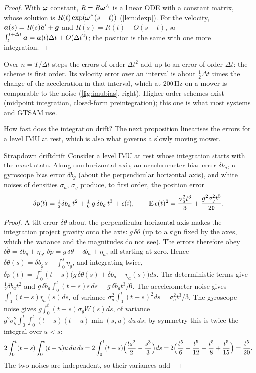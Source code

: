 \begin{proof}
With $\bm{\omega}$ constant, $\dot R=R\bm{\omega}^{\wedge}$ is a linear ODE with a
constant matrix, whose solution is $R(t)\exp(\bm{\omega}^{\wedge}(s-t))$
(\cref{lem:dexp}). For the velocity, $\bm{a}(s)=R(s)\tilde{\bm{a}}'
+\bm{g}$ and $R(s)=R(t)+O(s-t)$, so $\int_t^{t+\Delta t}\bm{a}=
\bm{a}(t)\Delta t+O(\Delta t^2)$; the position is the same with one
more integration.
\end{proof}

Over $n=T/\Delta t$ steps the errors of order $\Delta t^2$ add up to an
error of order $\Delta t$: the scheme is first order. Its velocity
error over an interval is about $\frac12\Delta t$ times the change of
the acceleration in that interval, which at 200\,Hz on a mower is
comparable to the noise (\cref{fig:imubias}, right). Higher-order
schemes exist (midpoint integration, closed-form preintegration); this
one is what most systems and GTSAM use.

How fast does the integration drift? The next proposition linearises
the errors for a level IMU at rest, which is also what governs a slowly
moving mower.

\begin{proposition}{Strapdown drift}{drift}
Consider a level IMU at rest whose integration starts with the exact
state. Along one horizontal axis, an accelerometer bias error $\delta
b_a$, a gyroscope bias error $\delta b_g$ (about the perpendicular
horizontal axis), and white noises of densities $\sigma_a$, $\sigma_g$
produce, to first order, the position error
\begin{equation}\label{eq:drift}
\delta p(t)=\tfrac12\delta b_a\,t^2+\tfrac16\,g\,\delta b_g\,t^3+
\epsilon(t),\qquad
\mathbb{E}\,\epsilon(t)^2=\frac{\sigma_a^2t^3}3+\frac{g^2\sigma_g^2t^5}{20}.
\end{equation}
\end{proposition}

\begin{proof}
A tilt error $\delta\theta$ about the perpendicular horizontal axis makes
the integration project gravity onto the axis: $g\,\delta\theta$ (up to
a sign fixed by the axes, which the variance and the magnitudes do not
see). The errors therefore obey $\delta\dot\theta=\delta b_g+\eta_g$,
$\delta\ddot p=g\,\delta\theta+\delta b_a+\eta_a$, all starting at zero.
Hence $\delta\theta(s)=\delta b_g\,s+\int_0^s\eta_g$, and integrating
twice, $\delta p(t)=\int_0^t(t-s)\bigl(g\,\delta\theta(s)+\delta b_a+
\eta_a(s)\bigr)ds$. The deterministic terms give $\frac12\delta b_at^2$
and $g\,\delta b_g\int_0^t(t-s)s\,ds=g\,\delta b_gt^3/6$. The
accelerometer noise gives $\int_0^t(t-s)\eta_a(s)ds$, of variance
$\sigma_a^2\int_0^t(t-s)^2ds=\sigma_a^2t^3/3$. The gyroscope noise gives
$g\int_0^t(t-s)\sigma_gW(s)ds$, of variance $g^2\sigma_g^2\int_0^t\!\int_0^t
(t-s)(t-u)\min(s,u)\,du\,ds$; by symmetry this is twice the integral
over $u<s$:
\[
2\int_0^t(t-s)\int_0^s(t-u)u\,du\,ds
=2\int_0^t(t-s)\Bigl(\frac{ts^2}2-\frac{s^3}3\Bigr)ds
=2\Bigl(\frac{t^5}6-\frac{t^5}{12}-\frac{t^5}{8}+\frac{t^5}{15}\Bigr)
=\frac{t^5}{20}.
\]
The two noises are independent, so their variances add.
\end{proof}

